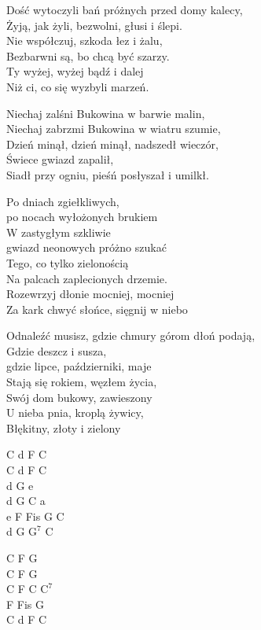 
\begin{text}
    Dość wytoczyli bań próżnych przed domy kalecy,\\
    Żyją, jak żyli, bezwolni, głusi i ślepi.\\
    Nie współczuj, szkoda łez i żalu,\\
    Bezbarwni są, bo chcą być szarzy.\\
    Ty wyżej, wyżej bądź i dalej\\
    Niż ci, co się wyzbyli marzeń.

    Niechaj zalśni Bukowina w barwie malin,\\
    Niechaj zabrzmi Bukowina w wiatru szumie,\\
    Dzień minął, dzień minął, nadszedł wieczór,\\
    Świece gwiazd zapalił,\\
    Siadł przy ogniu, pieśń posłyszał i umilkł.

    Po dniach zgiełkliwych,\\
    po nocach wyłożonych brukiem\\
    W zastygłym szkliwie\\
    gwiazd neonowych próżno szukać\\
    Tego, co tylko zielonością\\
    Na palcach zaplecionych drzemie.\\
    Rozewrzyj dłonie mocniej, mocniej\\
    Za kark chwyć słońce, sięgnij w niebo

    Odnaleźć musisz, gdzie chmury górom dłoń podają,\\
    Gdzie deszcz i susza,\\
    gdzie lipce, październiki, maje\\
    Stają się rokiem, węzłem życia,\\
    Swój dom bukowy, zawieszony\\
    U nieba pnia, kroplą żywicy,\\
    Błękitny, złoty i zielony
\end{text}
\begin{chord}
    C d F C\\
    C d F C\\
    d G e\\
    d G C a\\
    e F Fis G C\\
    d G $\mathrm{G^7}$ C

    C F G\\
    C F G\\
    C F C $\mathrm{C^7}$\\
    F Fis G\\
    C d F C
\end{chord}
